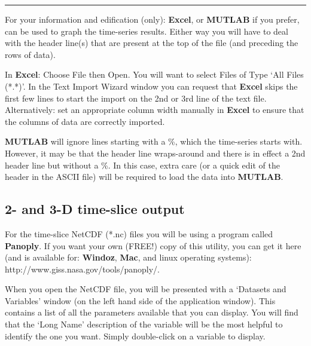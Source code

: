 \documentclass[11pt,fleqn]{book} %
\begin{document}
\vspace{1mm}
\noindent\rule{4cm}{0.1mm}
\vspace{2mm}

\noindent For your information and edification (only): \textbf{Excel}, or \textbf{MUTLAB} if you prefer, can be used to graph the time-series results. Either way you will have to deal with the header line(s) that are present at the top of the file (and preceding the rows of data).

In \textbf{Excel}: Choose \textsf{\footnotesize File} then \textsf{\footnotesize Open}.  You will want to select \textsf{\footnotesize Files of Type} ‘\textsf{\footnotesize All Files (*.*)}’. In the \textsf{\footnotesize Text Import Wizard} window you can request that \textbf{Excel} skips the first few lines to start the import on the 2nd or 3rd line of the text file. Alternatively: set an appropriate column width manually in \textbf{Excel} to ensure that the columns of data are correctly imported.

\textbf{MUTLAB} will ignore lines starting with a \textsf{\footnotesize \%}, which the time-series starts with. However, it may be that the header line wraps-around and there is in effect a 2nd header line but without a \textsf{\footnotesize \%}. In this case, extra care (or a quick edit of the header in the ASCII file) will be required to load the data into \textbf{MUTLAB}.


\subsection{2- and 3-D time-slice output}

For the time-slice NetCDF (*.nc) files you will be using a program called \textbf{Panoply}. If you want your own (FREE!) copy of this utility, you can get it here (and is available for: \textbf{Windoz}, \textbf{Mac}, and linux operating systems): http://www.giss.nasa.gov/tools/panoply/.

\noindent When you open the NetCDF file, you will be presented with a ‘\textsf{\footnotesize Datasets and Variables}’ window (on the left hand side of the application window). This contains a list of all the parameters available that you can display. You will find that the ‘\textsf{\footnotesize Long Name}’ description of the variable will be the most helpful to identify the one you want. Simply double-click on a variable to display. 
\end{document}
